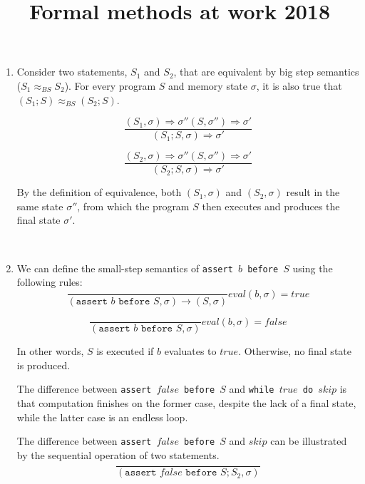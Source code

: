 \documentclass[11pt]{article}
\begin{document}
\title{Formal methods at work 2018}

\begin{enumerate}
	\item Consider two statements, $S_1$ and $S_2$, that are equivalent by big step semantics ($S_1 \approx_{BS} S_2$).
		For every program $S$ and memory state $
	\sigma$, it is also true that $(S_1;S) \approx_{BS} (S_2;S)$. 
		
		\begin{equation}
			\frac{(S_1,\sigma)\Rightarrow\sigma'' (S,\sigma'')\Rightarrow\sigma'}{(S_1;S,\sigma)\Rightarrow\sigma'} 
		\end{equation}
		
		\begin{equation}
			\frac{(S_2,\sigma)\Rightarrow\sigma'' (S,\sigma'')\Rightarrow\sigma'}{(S_2;S,\sigma)\Rightarrow\sigma'}
		\end{equation}
		
		By the definition of equivalence, both $(S_1,\sigma)$ and $(S_2,\sigma)$ result in the same state $\sigma''$, from which the program $S$ then executes and produces the final state $\sigma'$.
		
		\\
		
	\item We can define the small-step semantics of \texttt{assert $b$ before $S$} using the following rules:
		\begin{equation}
			\frac{}{(\texttt{assert }b\texttt{ before }S,\sigma)\rightarrow (S,\sigma)}eval(b,\sigma)=true
		\end{equation}
		
		\begin{equation}
			\frac{}{(\texttt{assert }b\texttt{ before }S,\sigma)}eval(b,\sigma)=false
		\end{equation}
		
		In other words, $S$ is executed if $b$ evaluates to $true$. Otherwise, no final state is produced.
		
		The difference between \texttt{assert $false$ before $S$} and \texttt{while $true$ do $skip$} is that computation finishes on the former case, despite the lack of a final state, while the latter case is an endless loop.
		
		The difference between \texttt{assert $false$ before $S$} and $skip$ can be illustrated by the sequential operation of two statements.		
		\begin{equation}
			\frac{}{(\texttt{assert }false\texttt{ before }S;S_2,\sigma)}	
		\end{equation}
		

\end{enumerate}
\end{document}
